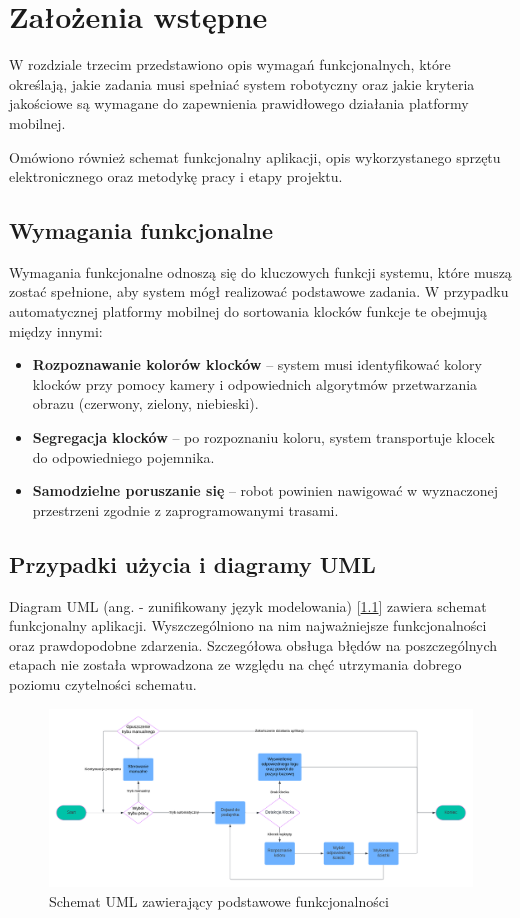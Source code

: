 \chapter{Założenia wstępne}
\label{ch:zalozenia-wstepne}

W rozdziale trzecim przedstawiono opis wymagań funkcjonalnych, które określają, jakie zadania musi spełniać system robotyczny oraz jakie kryteria jakościowe są wymagane do zapewnienia prawidłowego działania platformy mobilnej. 

Omówiono również schemat funkcjonalny aplikacji, opis wykorzystanego sprzętu elektronicznego oraz metodykę pracy i etapy projektu.


\section{Wymagania funkcjonalne}
Wymagania funkcjonalne odnoszą się do kluczowych funkcji systemu, które muszą zostać spełnione, aby system mógł realizować podstawowe zadania. W przypadku automatycznej platformy mobilnej do sortowania klocków funkcje te obejmują między innymi:
\begin{itemize}
    \item \textbf{Rozpoznawanie kolorów klocków} – system musi identyfikować kolory klocków przy pomocy kamery i odpowiednich algorytmów przetwarzania obrazu (czerwony, zielony, niebieski).
    \item \textbf{Segregacja klocków} – po rozpoznaniu koloru, system transportuje klocek do odpowiedniego pojemnika.
    \item \textbf{Samodzielne poruszanie się} – robot powinien nawigować w wyznaczonej przestrzeni zgodnie z zaprogramowanymi trasami.
\end{itemize}

\section{Przypadki użycia i diagramy UML}

Diagram UML (ang.  - zunifikowany język modelowania) [\ref{rys1:schemat_uml}] zawiera schemat funkcjonalny aplikacji. Wyszczególniono na nim najważniejsze funkcjonalności oraz prawdopodobne zdarzenia. Szczegółowa obsługa błędów na poszczególnych etapach nie została wprowadzona ze względu na chęć utrzymania dobrego poziomu czytelności schematu. 

\begin{figure}[h!]
    \centering
    \includegraphics[width=1.0\textwidth]{./graf/uml.png}
    \caption{Schemat UML zawierający podstawowe funkcjonalności}
    \label{rys1:schemat_uml}
\end{figure}

